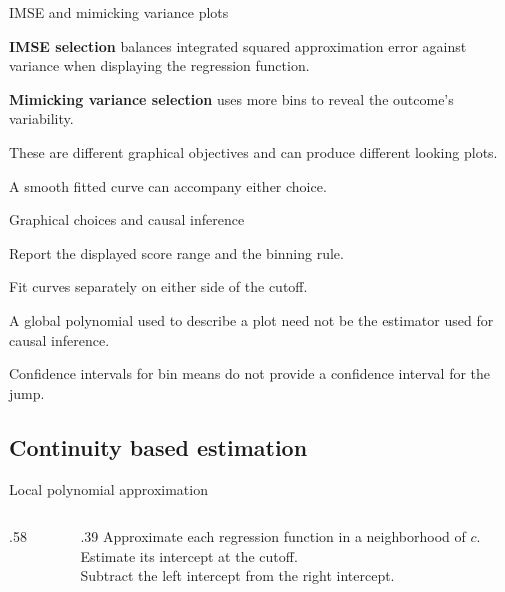 \begin{frame}{IMSE and mimicking variance plots}
\begin{items}
\item \textbf{IMSE selection} balances integrated squared approximation error against variance when displaying the regression function.
\item \textbf{Mimicking variance selection} uses more bins to reveal the outcome's variability.
\item These are different graphical objectives and can produce different looking plots.
\item A smooth fitted curve can accompany either choice.
\end{items}
\end{frame}

\begin{frame}{Graphical choices and causal inference}
\begin{items}
\item Report the displayed score range and the binning rule.
\item Fit curves separately on either side of the cutoff.
\item A global polynomial used to describe a plot need not be the estimator used for causal inference.
\item Confidence intervals for bin means do not provide a confidence interval for the jump.
\end{items}
\end{frame}

\subsection{Continuity based estimation}
\begin{frame}{Local polynomial approximation}
\begin{columns}
\begin{column}{.58\textwidth}\end{column}
\begin{column}{.39\textwidth}
Approximate each regression function in a neighborhood of $c$.\\[.8em]
Estimate its intercept at the cutoff.\\[.8em]
Subtract the left intercept from the right intercept.
\end{column}
\end{columns}
\end{frame}

